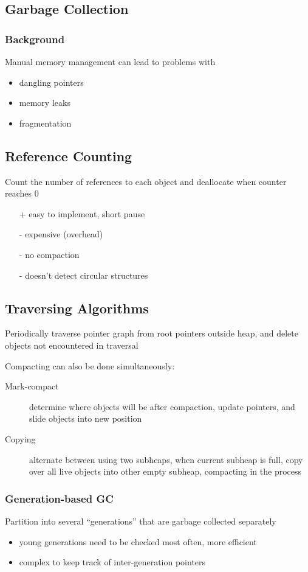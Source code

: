 \documentclass[]{article}
\theoremstyle{definition}
\begin{document}
	\subsection{Garbage Collection}
	\subsubsection{Background}
	Manual memory management can lead to problems with
	\begin{itemize}
		\item dangling pointers
		\item memory leaks
		\item fragmentation
	\end{itemize}

	\subsection{Reference Counting}
	Count the number of references to each object and deallocate when counter reaches 0
	\begin{itemize}
		\item[+] easy to implement, short pause
		\item[-] expensive (overhead)
		\item[-] no compaction
		\item[-] doesn't detect circular structures
	\end{itemize}

	\subsection{Traversing Algorithms}
	Periodically traverse pointer graph from root pointers outside heap, and delete objects not encountered in traversal

	Compacting can also be done simultaneously:
	\begin{description}
		\item[Mark-compact] determine where objects will be after compaction, update pointers, and slide objects into new position
		\item[Copying] alternate between using two subheaps, when current subheap is full, copy over all live objects into other empty subheap, compacting in the process
	\end{description}

	\subsubsection{Generation-based GC}
	Partition into several ``generations'' that are garbage collected separately
	\begin{itemize}
		\item young generations need to be checked most often, more efficient
		\item complex to keep track of inter-generation pointers
	\end{itemize}
\end{document}
